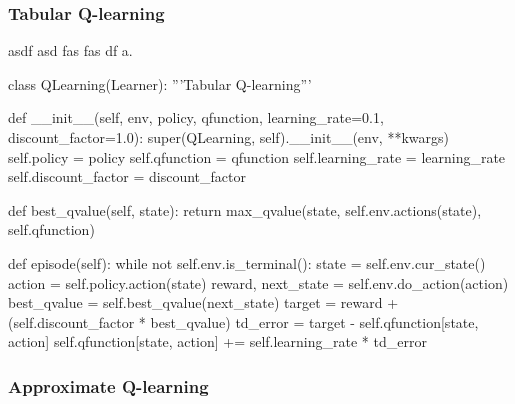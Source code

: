 \documentclass{article}
\begin{document}
\pagebreak[4]

\subsubsection{Tabular Q-learning}

asdf asd fas fas df a.

\begin{python}
class QLearning(Learner):
    '''Tabular Q-learning'''

    def __init__(self, env, policy, qfunction, learning_rate=0.1, discount_factor=1.0):
        super(QLearning, self).__init__(env, **kwargs)
        self.policy = policy
        self.qfunction = qfunction
        self.learning_rate = learning_rate
        self.discount_factor = discount_factor

    def best_qvalue(self, state):
        return max_qvalue(state, self.env.actions(state), self.qfunction)

    def episode(self):
        while not self.env.is_terminal():
            state = self.env.cur_state()
            action = self.policy.action(state)
            reward, next_state = self.env.do_action(action)
            best_qvalue = self.best_qvalue(next_state)
            target = reward + (self.discount_factor * best_qvalue)
            td_error = target - self.qfunction[state, action]
            self.qfunction[state, action] += self.learning_rate * td_error
\end{python}

\subsubsection{Approximate Q-learning}
\end{document}
